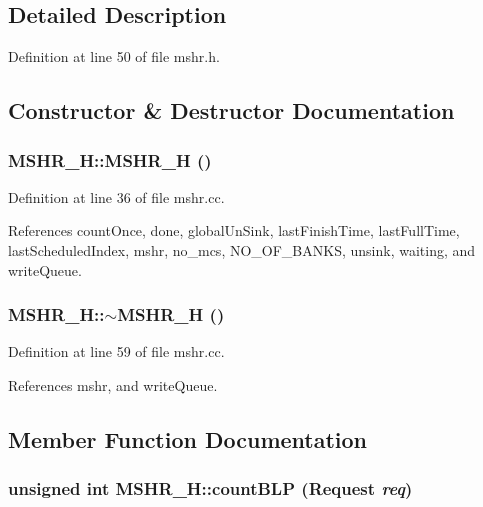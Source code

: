 \subsection{Detailed Description}


Definition at line 50 of file mshr.h.

\subsection{Constructor \& Destructor Documentation}
\subsubsection[{MSHR\_\-H}]{\setlength{\rightskip}{0pt plus 5cm}MSHR\_\-H::MSHR\_\-H ()}\label{classMSHR__H_ed75aac9537ffb4d5814b337c1099e82}




Definition at line 36 of file mshr.cc.

References countOnce, done, globalUnSink, lastFinishTime, lastFullTime, lastScheduledIndex, mshr, no\_\-mcs, NO\_\-OF\_\-BANKS, unsink, waiting, and writeQueue.
\subsubsection[{$\sim$MSHR\_\-H}]{\setlength{\rightskip}{0pt plus 5cm}MSHR\_\-H::$\sim$MSHR\_\-H ()}\label{classMSHR__H_cbe3ee20d72b496c43ef9f6375f4da1b}




Definition at line 59 of file mshr.cc.

References mshr, and writeQueue.

\subsection{Member Function Documentation}
\subsubsection[{countBLP}]{\setlength{\rightskip}{0pt plus 5cm}unsigned int MSHR\_\-H::countBLP ({\bf Request} {\em req})}\label{classMSHR__H_5da0445647a27cbacf66210de6f88f71}




